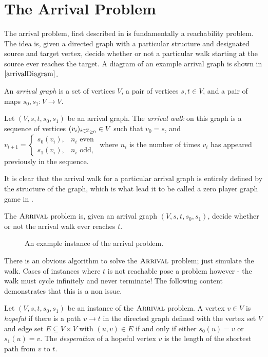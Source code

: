 \section{The Arrival Problem}
The arrival problem, first described in \citep{arrivalBasic} is fundamentally
a reachability problem. The idea is, given a directed graph with
a particular structure and designated source and target vertex,
decide whether or not a particular walk starting at the source
ever reaches the target. A diagram of an example arrival graph is shown
in $\cref{arrivalDiagram}$.
\begin{definition}
  An \emph{arrival graph} is a set of vertices $V$, a pair of
  vertices $s, t \in V$, and a pair of maps 
  $s_0, s_1 : V \to V$. 
\end{definition}
\begin{definition}
  Let $(V, s, t, s_0, s_1)$ be an arrival graph. The \emph{arrival walk}
  on this graph is a sequence of vertices $(v_i)_{i \in \mathbb{Z}_{\geq 0}} \in V$
  such that $v_0 = s$, and $v_{i+1} = 
  \begin{cases} 
    s_0(v_i), & \text{$n_i$ even}\\  
    s_1(v_i), & \text{$n_i$ odd},
  \end{cases}$
  where $n_i$ is the number of times $v_i$ has appeared previously in
  the sequence.
\end{definition}
It is clear that the arrival walk for a particular arrival graph
is entirely defined by the structure of the graph, which is what
lead it to be called a zero player graph game in \citep{arrivalBasic}.
\begin{definition}
  The $\textsc{Arrival}$ problem is, given an arrival graph $(V, s, t, s_0, s_1)$,
  decide whether or not the arrival walk ever reaches $t$.
\end{definition}
\begin{figure}[h]
  
  \caption{An example instance of the arrival problem.}\label{arrivalDiagram}
\end{figure}
There is an obvious algorithm to solve the $\textsc{Arrival}$ problem;
just simulate the walk. Cases of instances where $t$ is not reachable pose a problem however -
the walk must cycle infinitely and never terminate!
The following content demonstrates that this is a non issue.
\begin{definition}
  Let $(V, s, t, s_0, s_1)$ be an instance of the $\textsc{Arrival}$ problem. A vertex $v \in V$
  is \emph{hopeful} if there is a path $v \to t$ in the directed graph defined with
  the vertex set $V$ and edge set $E \subseteq V \times V$ with $(u, v) \in E$ if and
  only if either $s_0(u) = v$ or $s_1(u) = v$. The \emph{desperation} of a hopeful vertex
  $v$ is the length of the shortest path from $v$ to $t$.
\end{definition}
